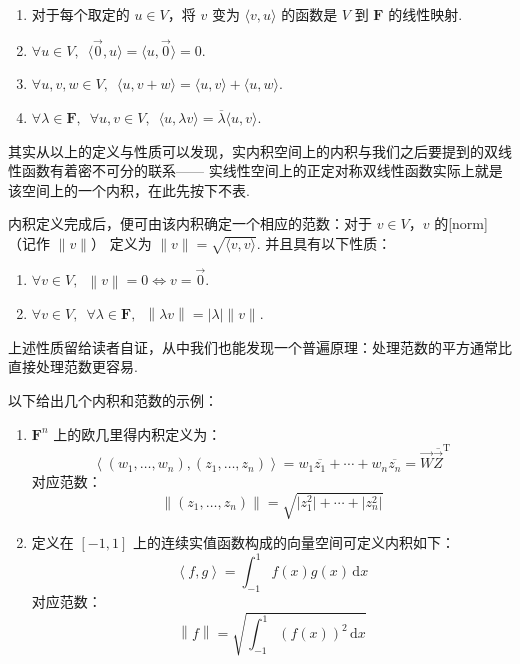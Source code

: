 \begin{enumerate}
    \item 对于每个取定的 $u \in V$，将 $ v $ 变为 $\langle v, u \rangle$ 的函数是 $ V $ 到 $\mathbf{F}$ 的线性映射.

    \item $\forall u \in V, \enspace \langle \vec{0}, u \rangle = \langle u, \vec{0} \rangle = 0$.

    \item $\forall u, v, w \in V, \enspace \langle u, v + w \rangle = \langle u, v \rangle + \langle u, w \rangle$.

    \item $\forall \lambda \in \mathbf{F}, \enspace \forall u, v \in V, \enspace \langle u, \lambda v \rangle = \overline{\lambda} \langle u, v \rangle$.
\end{enumerate}

其实从以上的定义与性质可以发现，实内积空间上的内积与我们之后要提到的双线性函数有着密不可分的联系——
实线性空间上的正定对称双线性函数实际上就是该空间上的一个内积，在此先按下不表.

\vspace{2ex}

内积定义完成后，便可由该内积确定一个相应的范数：对于 $v \in V$，$v$ 的[norm]（记作 $ \lVert v \rVert $）
定义为 $ \lVert v \rVert = \sqrt{\langle v, v \rangle}$. 并且具有以下性质：

\begin{enumerate}
    \item $\forall v \in V, \enspace \left\lVert v \right\rVert = 0 \iff v = \vec{0}$.

    \item $\forall v \in V, \enspace \forall \lambda \in \mathbf{F},
          \enspace \left\lVert \lambda v \right\rVert  = \left\lvert \lambda \right\rvert \lVert v \rVert$.
\end{enumerate}

上述性质留给读者自证，从中我们也能发现一个普遍原理：处理范数的平方通常比直接处理范数更容易.

\vspace{2ex}

以下给出几个内积和范数的示例：

\begin{example} \label{ex:22:内积和范数}
    \begin{enumerate}
        \item $\mathbf{F}^{n}$ 上的欧几里得内积定义为：
        \[\left\langle (w_1, \ldots, w_n), (z_1, \ldots, z_n)\right\rangle = w_1\overline{z_1} + \cdots + w_n\overline{z_n} = \vec{W}\overline{\vec{Z}}^{\mathrm{T}}\]
        对应范数：
        \[\left\lVert (z_1, \ldots, z_n) \right\rVert  = \sqrt{\lvert z^2_1 \rvert + \cdots + \lvert z^2_n \rvert}\]

        \item 定义在 $ \left[-1, 1\right] $ 上的连续实值函数构成的向量空间可定义内积如下：
        \[\left\langle f, g\right\rangle = \int_{-1}^1f(x)g(x)\,\mathrm{d}x\]
        对应范数：
        \[\left\lVert f \right\rVert = \sqrt{\int_{-1}^1(f(x))^2\,\mathrm{d}x}\]
    \end{enumerate}
\end{example}

